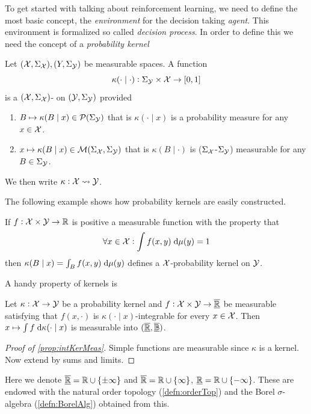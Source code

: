 


To get started with talking about reinforcement learning,
we need to define the most basic concept, the
\emph{environment} for the decision taking \emph{agent}.
This environment is formalized so called \emph{decision process}.
In order to define this we need the concept of a \emph{probability kernel}

\begin{defn}
  Let $(\mathcal{X}, \Sigma_\mathcal{X}), (Y, \Sigma_\mathcal{Y})$ be measurable spaces.
  A function
  \[ \kappa(\cdot \mid \cdot) : \Sigma_\mathcal{Y} \times \mathcal{X} \to [0,1] \]
  is a $(\mathcal{X}, \Sigma_\mathcal{X})$-
  on $(\mathcal{Y}, \Sigma_\mathcal{Y})$ provided
  \begin{enumerate}
    \item $B \mapsto \kappa(B \mid x) \in \mathcal{P}(\Sigma_\mathcal{Y})$
      that is $\kappa(\cdot \mid x)$ is a probability measure
      for any $x \in \mathcal{X}$.
    \item
      $x \mapsto \kappa(B \mid x) \in \mathcal{M}(\Sigma_\mathcal{X}, \Sigma_\mathcal{Y})$
      that is $\kappa(B \mid \cdot)$ is ($\Sigma_\mathcal{X}$-$\Sigma_\mathcal{Y}$)
      measurable for any $B \in \Sigma_\mathcal{Y}$.
  \end{enumerate}
  We then write $\kappa : \mathcal{X} \leadsto \mathcal{Y}$.
  \label{defn:probKer}
\end{defn}

The following example shows how probability kernels are easily constructed.
\begin{example}
  If $f : \mathcal{X} \times \mathcal{Y} \to \mathbb{R}$ is positive a measurable function with
  the property that
  \[ \forall x \in \mathcal{X} : \int f(x, y) \; \mathrm{d} \mu(y) = 1 \]
  then $\kappa(B \mid x) = \int_B f(x, y) \; \mathrm{d} \mu(y)$ defines a
  $\mathcal{X}$-probability kernel on $\mathcal{Y}$.
\end{example}

A handy property of kernels is
\begin{prop}
  Let $\kappa : \mathcal{X} \to \mathcal{Y}$ be a probability kernel
  and $f : \mathcal{X} \times \mathcal{Y} \to \overline{\underline{\mathbb{R}}}$ be measurable satisfying
  that $f(x, \cdot)$ is $\kappa(\cdot \mid x)$-integrable for every $x \in \mathcal{X}$.
  Then $x \mapsto \int f \; \mathrm{d} \kappa(\cdot \mid x)$ is measurable
  into $(\overline{\underline{\mathbb{R}}}, \overline{\underline{\mathbb{B}}})$.
  \label{prop:intKerMeas}
\end{prop}
\begin{proof}[Proof of \cref{prop:intKerMeas}]
  Simple functions are measurable since $\kappa$ is a kernel.
  Now extend by sums and limits.
\end{proof}
Here we denote $\overline{\underline{\mathbb{R}}} = \mathbb{R} \cup \{\pm \infty\}$ and $\overline{\mathbb{R}} = \mathbb{R} \cup \{\infty\}$,
$\underline{\mathbb{R}} = \mathbb{R} \cup \{-\infty\}$.
These are endowed with the natural order topology
(\cref{defn:orderTop}) and the Borel $\sigma$-algebra
(\cref{defn:BorelAlg}) obtained from this.

